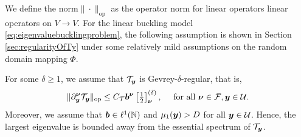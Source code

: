 We define the norm$\| \cdot \|_{\text{op}}$ as the operator norm for linear operators linear operators on $V \to V$. For the linear buckling model \eqref{eq:eigenvaluebucklingproblem}, the following assumption is shown in Section \ref{sec:regularityOfTy} under some relatively mild assumptions on the random domain mapping $\Phi$.
\begin{assumption}\label{ass:gevreyTy} 
For some $\delta \geq 1$, we assume that $\mathcal{T}_{\boldsymbol{y}}$ is Gevrey-$\delta$-regular, that is,
\begin{equation}\label{eq:assumptionTyregular}
            \| \partial^{{\boldsymbol{\nu}}}_{{\boldsymbol{y}}} \mathcal{T}_{\boldsymbol{y}} \|_{\mathrm{op}} \leq C_{\mathcal{T}} {\boldsymbol{b}}^{{\boldsymbol{\nu}}} \left[\tfrac{1}{2} \right]^{(\delta)}_{{\boldsymbol{\nu}}}, \quad  \text{ for all } {\boldsymbol{\nu}} \in \mathcal{F}, {\boldsymbol{y}} \in \mathcal{U}.
 \end{equation}
Moreover, we assume that ${\boldsymbol{b}} \in \ell^1(\mathbb{N})$
and $\mu_1({\boldsymbol{y}})  > D$ for all ${\boldsymbol{y}} \in \mathcal{U}$. Hence, the largest eigenvalue is bounded away from the essential spectrum of $\mathcal{T}_{\boldsymbol{y}}$.    
\end{assumption}



